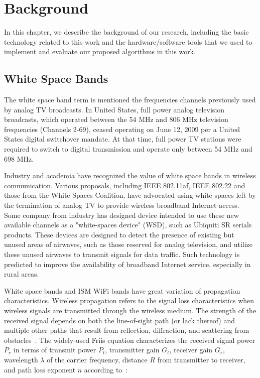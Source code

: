 \chapter{Background} 
\label{ch:background}

In this chapter, we describe the background of our research, 
including the basic technology related to this work and the 
hardware/software tools that we used to implement and evaluate 
our proposed algorithms in this work.


\section{White Space Bands}

The white space band term is mentioned the frequencies channels 
previously used by analog TV broadcasts. In United States, full 
power analog television broadcasts, which operated between the 
54 MHz and 806 MHz television frequencies (Channels 2-69), ceased 
operating on June 12, 2009 per a United States digital switchover 
mandate. At that time, full power TV stations were required to 
switch to digital transmission and operate only between 54 MHz 
and 698 MHz.~\cite{fccwhitespace} 

Industry and academia have recognized the value of white space 
bands in wireless communication. Various proposals, including 
IEEE 802.11af, IEEE 802.22 and those from the White Spaces 
Coalition, have advocated using white spaces left by the termination 
of analog TV to provide wireless broadband Internet access. Some 
company from industry has designed device intended to use these 
new available channels as a "white-spaces device" (WSD), such as 
Ubiquiti SR serials products. These devices are designed to detect 
the presence of existing but unused areas of airwaves, such as 
those reserved for analog television, and utilize these unused 
airwaves to transmit signals for data traffic. Such technology 
is predicted to improve the availability of broadband Internet 
service, especially in rural areas.

White space bands and ISM WiFi bands have great variation of 
propagation characteristics. Wireless propagation refers to 
the signal loss characteristics when wireless signals are 
transmitted through the wireless medium. The strength of the 
received signal depends on both the line-of-sight path (or lack 
thereof) and multiple other paths that result from reflection, 
diffraction, and scattering from obstacles~\cite{andersen1995propagation}. 
The widely-used Friis equation characterizes the received signal 
power $P_r$ in terms of transmit power $P_t$, transmitter gain 
$G_t$, receiver gain $G_r$, wavelength $\lambda$ of the carrier 
frequency, distance $R$ from transmitter to receiver, and path 
loss exponent $n$ according to~\cite{friis}:

